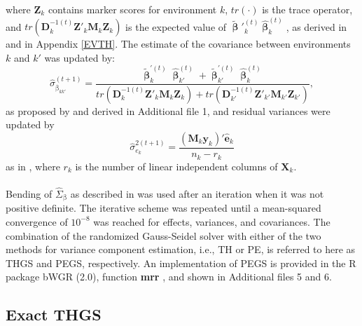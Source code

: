 \documentclass{bmcart}
\begin{document}
where $\mathbf{Z}_k$ contains marker scores for environment $k$, $tr(\cdot)$ is the trace operator, and $tr(\mathbf{D}^{-1(t)}_k \mathbf{Z}'_k \mathbf{M}_{k} \mathbf{Z}_k)$ is the expected value of $\tilde{\mathbf{\upbeta}}'^{(t)}_k\hat{\mathbf{\upbeta}}^{(t)}_k$, as derived in \cite{VanRaden} and in Appendix \ref{EVTH}. The 
estimate of the covariance between environments $k$ and $k'$ was updated by:
\begin{equation}
\label{eqn:SigmaBij}
\hat{\sigma}^{(t+1)}_{\upbeta_{kk'}} = \frac{\tilde{\mathbf{\upbeta}}^{'(t)}_k\hat{\mathbf{\upbeta}}^{(t)}_{k'} + \tilde{\mathbf{\upbeta}}^{'(t)}_{k'}\hat{\mathbf{\upbeta}}^{(t)}_k}{tr(\mathbf{D}^{-1(t)}_k \mathbf{Z}'_k \mathbf{M}_{k} \mathbf{Z}_k)+tr(\mathbf{D}^{-1(t)}_{k'} \mathbf{Z}'_{k'} \mathbf{M}_{k'} \mathbf{Z}_{k'})},
\end{equation}
as proposed by \cite{Schaeffer} and derived in Additional file 1, and residual variances were updated by
\begin{equation}
\label{eqn:SigmaEk}
\hat{\sigma}^{2(t+1)}_{e_k} = 
\frac{(\mathbf{M}_{k}\mathbf{y}_k)'\hat{\mathbf{e}}_k}{n_k-r_k}
\end{equation}
as in \cite{GSRU}, where $r_k$ is the number of linear independent columns of $\mathbf{X}_k$.
\\\\
Bending of $\hat{\Sigma}_{\upbeta}$ as described in \cite{bend0} was used after an iteration when it was not positive definite. The iterative scheme was repeated until a mean-squared convergence of $10^{-8}$ was reached for effects, variances, and covariances. The combination of the randomized Gauss-Seidel solver with either of the two methods for variance component estimation, i.e., TH or PE, is referred to here as THGS and PEGS, respectively. An implementation of PEGS is provided in the R package bWGR (2.0), function \textbf{mrr} \cite{bWGR}, and shown in Additional files 5 and 6.

\subsection{Exact THGS}
\end{document}
